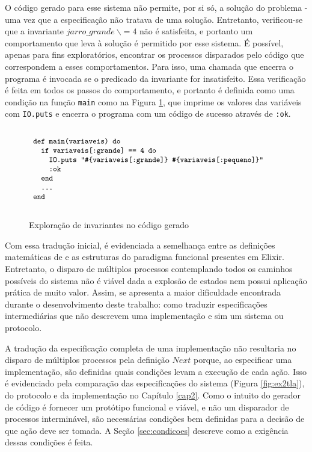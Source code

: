 O código gerado para esse sistema não permite, por si só, a solução do problema - uma vez que a especificação não tratava de uma solução. Entretanto, verificou-se que a invariante $jarro\_grande\ \backslash= 4$ não é satisfeita, e portanto um comportamento que leva à solução é permitido por esse sistema. É possível, apenas para fins exploratórios, encontrar os processos disparados pelo código que correspondem a esses comportamentos. Para isso, uma chamada que encerra o programa é invocada se o predicado da invariante for insatisfeito. Essa verificação é feita em todos os passos do comportamento, e portanto é definida como uma condição na função \texttt{main} como na Figura \ref{fig:invariant-ex1}, que imprime os valores das variáveis com \texttt{IO.puts} e encerra o programa com um código de sucesso através de \texttt{:ok}.

\begin{figure}[h]
  \centering
  $\progfig{
  ~def main(variaveis) do\\
  ~~~if variaveis[:grande] == 4 do\\
  ~~~~~IO.puts "\#\{variaveis[:grande]\} \#\{variaveis[:pequeno]\}"\\
  ~~~~~:ok\\
  ~~~end\\
  ~~~\dots\\
  ~end
  }$
  \caption{Exploração de invariantes no código gerado}
\label{fig:invariant-ex1}
\end{figure}

Com essa tradução inicial, é evidenciada a semelhança entre as definições
matemáticas de \TLA e as estruturas do paradigma funcional presentes em Elixir.
Entretanto, o disparo de múltiplos processos contemplando todos os caminhos
possíveis do sistema não é viável dada a explosão de estados nem possui
aplicação prática de muito valor. Assim, se apresenta a maior dificuldade
encontrada durante o desenvolvimento deste trabalho: como traduzir
especificações intermediárias que não descrevem uma implementação e sim um
sistema ou protocolo.

A tradução da especificação completa de uma implementação não resultaria no
disparo de múltiplos processos pela definição $Next$ porque, ao especificar uma
implementação, são definidas quais condições levam a execução de cada ação. Isso
é evidenciado pela comparação das especificações do sistema (Figura
\ref{fig:ex2tla}), do protocolo e da implementação no Capítulo \ref{cap2}. Como o
intuito do gerador de código é fornecer um protótipo funcional e viável, e não
um disparador de processos interminável, são necessárias condições bem definidas
para a decisão de que ação deve ser tomada. A Seção \ref{sec:condicoes}
descreve como a exigência dessas condições é feita.

